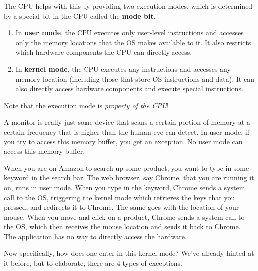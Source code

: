 \documentclass{article}
\newcounter{definition}[section]
\newcounter{example}[section]
\begin{document}
    \begin{definition}
      \label{def:execution-modes}
      The CPU helps with this by providing two execution modes, which is determined by a special bit in the CPU called the \textbf{mode bit}. 
      \begin{enumerate}
        \item In \textbf{user mode}, the CPU executes only user-level instructions and accesses only the memory locations that the OS makes available to it. It also restricts which hardware components the CPU can directly access. 
        \item In \textbf{kernel mode}, the CPU executes any instructions and accesses any memory location (including those that store OS instructions and data). It can also directly access hardware components and execute special instructions. 
      \end{enumerate}
      Note that the execution mode is \textit{property of the CPU}!  
    \end{definition}

    \begin{example}[Monitor]
      \label{ex:monitor}
      A monitor is really just some device that scans a certain portion of memory at a certain frequency that is higher than the human eye can detect. In user mode, if you try to access this memory buffer, you get an exception. No user mode can access this memory buffer. 
    \end{example}

    \begin{example}
      \label{ex:amazon-com}
      When you are on Amazon to search up some product, you want to type in some keyword in the search bar. The web browser, say Chrome, that you are running it on, runs in user mode. When you type in the keyword, Chrome sends a system call to the OS, triggering the kernel mode which retrieves the keys that you pressed, and redirects it to Chrome. The same goes with the location of your mouse. When you move and click on a product, Chrome sends a system call to the OS, which then receives the mouse location and sends it back to Chrome. The application has no way to directly access the hardware. 
    \end{example}

    Now specifically, how does one enter in this kernel mode? We've already hinted at it before, but to elaborate, there are 4 types of exceptions. 
\end{document}
